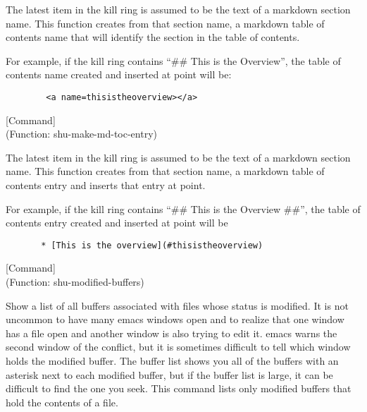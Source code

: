 \begin{doc-string}
The latest item in the kill ring is assumed to be the text of a markdown
section name.  This function creates from that section name, a markdown table of
contents name that will identify the section in the table of contents.

For example, if the kill ring contains ``\#\# This is the Overview'', the table
of contents name created and inserted at point will be:

\small{\begin{verbatim}
        <a name=thisistheoverview></a>
\end{verbatim}}
\end{doc-string}

\vspace{1em}
\noindent
{}
\usebox{\funcname}
 \hfill [Command]\\%
 (Function: shu-make-md-toc-entry)

\begin{doc-string}
The latest item in the kill ring is assumed to be the text of a markdown
section name.  This function creates from that section name, a markdown table of
contents entry and inserts that entry at point.

For example, if the kill ring contains ``\#\# This is the Overview \#\#'', the table
of contents entry created and inserted at point will be

\small{\begin{verbatim}
       * [This is the overview](#thisistheoverview)
\end{verbatim}}
\end{doc-string}

\vspace{1em}
\noindent
{}
\usebox{\funcname}
 \hfill [Command]\\%
 (Function: shu-modified-buffers)

\begin{doc-string}
Show a list of all buffers associated with files whose status is modified.
It is not uncommon to have many emacs windows open and to realize that one
window has a file open and another window is also trying to edit it.  emacs
warns the second window of the conflict, but it is sometimes difficult to tell
which window holds the modified buffer.  The buffer list shows you all of the
buffers with an asterisk next to each modified buffer, but if the buffer list
is large, it can be difficult to find the one you seek.  This command lists
only modified buffers that hold the contents of a file.
\end{doc-string}

